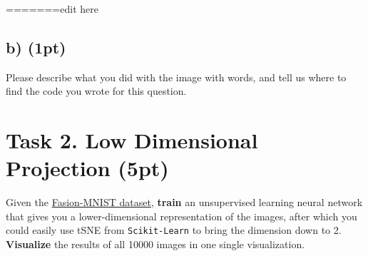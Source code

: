 \documentclass[english]{article}
\begin{document}

=======edit here

\subsection{b) (1pt)}
Please describe what you did with the image with words, and tell us where to find the code you wrote for this question.


\clearpage



\section{Task 2. Low Dimensional Projection (5pt)}
Given the \href{https://github.com/zalandoresearch/fashion-mnist}{Fasion-MNIST dataset}, \textbf{train} an unsupervised learning neural network that gives you a lower-dimensional representation of the images, after which you could easily use tSNE from \texttt{Scikit-Learn} to bring the dimension down to 2. \textbf{Visualize} the results of all 10000 images in one single visualization.
\end{document}
